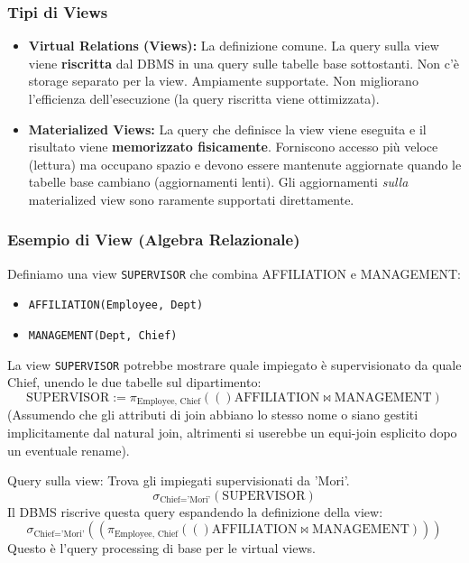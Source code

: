 \documentclass{article}
\newcommand{\selectop}[2]{\sigma_{#1}(#2)}
\newcommand{\project}[2]{\pi_{#1}(#2)}
\newcommand{\naturaljoin}{\Join}
\begin{document}
	\subsubsection{Tipi di Views}
	\begin{itemize}
		\item \textbf{Virtual Relations (Views):} La definizione comune. La query sulla view viene \textbf{riscritta} dal DBMS in una query sulle tabelle base sottostanti. Non c'è storage separato per la view. Ampiamente supportate. Non migliorano l'efficienza dell'esecuzione (la query riscritta viene ottimizzata).
		\item \textbf{Materialized Views:} La query che definisce la view viene eseguita e il risultato viene \textbf{memorizzato fisicamente}. Forniscono accesso più veloce (lettura) ma occupano spazio e devono essere mantenute aggiornate quando le tabelle base cambiano (aggiornamenti lenti). Gli aggiornamenti \textit{sulla} materialized view sono raramente supportati direttamente.
	\end{itemize}
	
	\subsubsection{Esempio di View (Algebra Relazionale)}
	Definiamo una view \texttt{SUPERVISOR} che combina AFFILIATION e MANAGEMENT:
	\begin{itemize}
		\item \texttt{AFFILIATION(Employee, Dept)}
		\item \texttt{MANAGEMENT(Dept, Chief)}
	\end{itemize}
	La view \texttt{SUPERVISOR} potrebbe mostrare quale impiegato è supervisionato da quale Chief, unendo le due tabelle sul dipartimento:
	$$ \text{SUPERVISOR} := \project{\text{Employee, Chief}}(\text{AFFILIATION} \naturaljoin \text{MANAGEMENT}) $$
	(Assumendo che gli attributi di join abbiano lo stesso nome o siano gestiti implicitamente dal natural join, altrimenti si userebbe un equi-join esplicito dopo un eventuale rename).
	
	Query sulla view: Trova gli impiegati supervisionati da 'Mori'.
	$$ \selectop{\text{Chief='Mori'}}{\text{SUPERVISOR}} $$
	Il DBMS riscrive questa query espandendo la definizione della view:
	$$ \selectop{\text{Chief='Mori'}}{(\project{\text{Employee, Chief}}(\text{AFFILIATION} \naturaljoin \text{MANAGEMENT}))} $$
	Questo è l'query processing di base per le virtual views.
	
\end{document}
